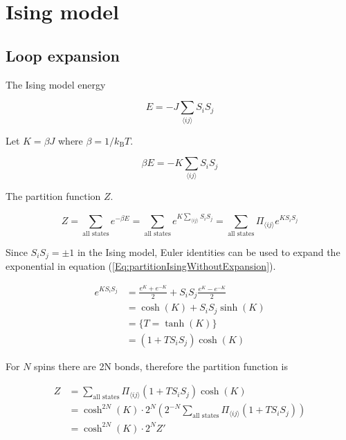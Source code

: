 \section{Ising model}

\subsection{Loop expansion}

The Ising model energy

\begin{equation}
    E = - J \sum_{\langle ij \rangle} S_i S_j
\end{equation}

Let $K = \beta J$ where $\beta = 1/k_{\text{B}} T$.

\begin{equation}
    \beta E = - K \sum_{\langle ij \rangle} S_i S_j
\end{equation}

The partition function $Z$.

\begin{equation}
    Z = \sum_{\text{all states}} e^{-\beta E} = \sum_{\text{all states}} e^{K \sum_{\langle ij \rangle} S_i S_j} = \sum_{\text{all states}} \Pi_{\langle ij \rangle} e^{K S_i S_j}
\label{Eq:partitionIsingWithoutExpansion}
\end{equation}

Since $S_i S_j = \pm 1$ in the Ising model, Euler identities can be used to expand the exponential in equation (\ref{Eq:partitionIsingWithoutExpansion}).

\begin{align*}
    e^{KS_i S_j} &= \frac{e^K + e^{-K}}{2} + S_i S_j \frac{e^K - e^{-K}}{2} \\
    &= \cosh (K) + S_i S_j \sinh(K) \\
    &= \{ T = \tanh(K) \} \\
    &= (1 + T S_i S_j) \cosh(K)
\end{align*}

For $N$ spins there are 2N bonds, therefore the partition function is

\begin{align*}
    Z &= \sum_{\text{all states}} \Pi_{\langle ij \rangle} (1 + T S_i S_j) \cosh(K) \\
    &= \cosh^{2N} (K) \cdot 2^N \left ( 2^{-N} \sum_{\text{all states}} \Pi_{\langle ij \rangle} (1 + T S_i S_j) \right ) \\
    &= \cosh^{2N} (K) \cdot 2^N Z'
\end{align*}

